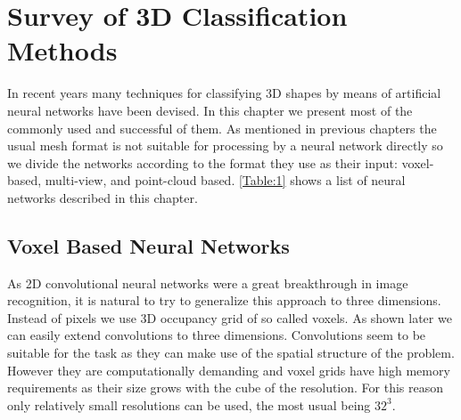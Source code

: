 \chapter{Survey of 3D Classification Methods}
\label{sec:chap3}
In recent years many techniques for classifying 3D shapes by means of artificial neural networks have been devised. In this chapter we present most of the commonly used and successful of them. As mentioned in previous chapters the usual mesh format is not suitable for processing by a neural network directly so we divide the networks according to the format they use as their input: voxel-based, multi-view, and point-cloud based. \autoref{Table:1} shows a list of neural networks described in this chapter.



\section{Voxel Based Neural Networks}
As 2D convolutional neural networks were a great breakthrough in image recognition, it is natural to try to generalize this approach to three dimensions. Instead of pixels we use 3D occupancy grid of so called voxels. As shown later we can easily extend convolutions to three dimensions. Convolutions seem to be suitable for the task as they can make use of the spatial structure of the problem. However they are computationally demanding and voxel grids have high memory requirements as their size grows with the cube of the resolution. For this reason only relatively small resolutions can be used, the most usual being $32^3$. 

